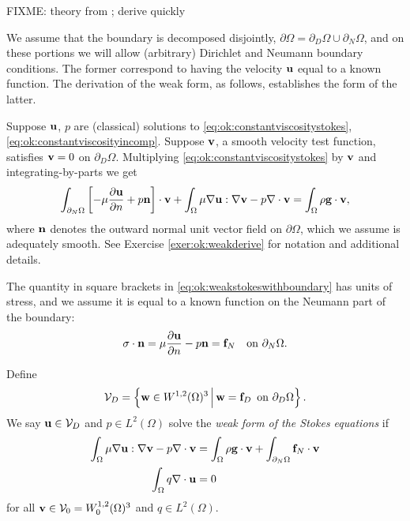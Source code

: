 FIXME: theory from \citep{Braess2007,Elmanetal2005}; derive quickly

We assume that the boundary is decomposed disjointly, $\partial\Omega = \partial_D\Omega \cup \partial_N\Omega$, and on these portions we will allow (arbitrary) Dirichlet and Neumann boundary conditions.  The former correspond to having the velocity $\mathbf{u}$ equal to a known function.  The derivation of the weak form, as follows, establishes the form of the latter.

Suppose $\mathbf{u}$, $p$ are (classical) solutions to \eqref{eq:ok:constantviscositystokes}, \eqref{eq:ok:constantviscosityincomp}.  Suppose $\mathbf{v}$, a smooth velocity test function, satisfies $\mathbf{v}=0$ on $\partial_D\Omega$.  Multiplying \eqref{eq:ok:constantviscositystokes} by $\mathbf{v}$ and integrating-by-parts we get
\begin{equation}
\int_{\partial_N \Omega} \left[- \mu \frac{\partial \mathbf{u}}{\partial n} + p \mathbf{n} \right] \cdot \mathbf{v} + \int_\Omega \mu \nabla \mathbf{u} : \nabla \mathbf{v} - p \nabla\cdot \mathbf{v} = \int_\Omega \rho \mathbf{g} \cdot \mathbf{v}, \label{eq:ok:weakstokeswithboundary}
\end{equation}
where $\mathbf{n}$ denotes the outward normal unit vector field on $\partial \Omega$, which we assume is adequately smooth.  See Exercise \ref{exer:ok:weakderive} for notation and additional details.

The quantity in square brackets in \eqref{eq:ok:weakstokeswithboundary} has units of stress, and we assume it is equal to a known function on the Neumann part of the boundary:
\begin{equation}
\sigma\cdot \mathbf{n} = \mu \frac{\partial \mathbf{u}}{\partial n} - p \mathbf{n} = \mathbf{f}_N \quad \text{on } \partial_N \Omega.  \label{eq:ok:neumannbc}
\end{equation}

Define
\begin{equation}
\mathcal{V}_D = \left\{\mathbf{w} \in W^{1,2}(\Omega)^3 \,\Big|\, \mathbf{w} = \mathbf{f}_D \, \text{ on } \partial_D \Omega\right\}. \label{eq:ok:dirichletbc}
\end{equation}
We say $\mathbf{u} \in \mathcal{V}_D$ and $p \in L^2(\Omega)$ solve the \emph{weak form of the Stokes equations} if
\begin{align}
\int_\Omega \mu \nabla \mathbf{u} : \nabla \mathbf{v} - p \nabla\cdot \mathbf{v} &= \int_\Omega \rho \mathbf{g} \cdot \mathbf{v} + \int_{\partial_N \Omega} \mathbf{f}_N \cdot \mathbf{v} \label{eq:ok:weakstokesvelocity} \\
\int_\Omega q \nabla\cdot \mathbf{u} &= 0 \label{eq:ok:weakstokespressure}
\end{align}
for all $\mathbf{v} \in \mathcal{V}_0 = W_0^{1,2}(\Omega)^3$ and $q \in L^2(\Omega)$.


